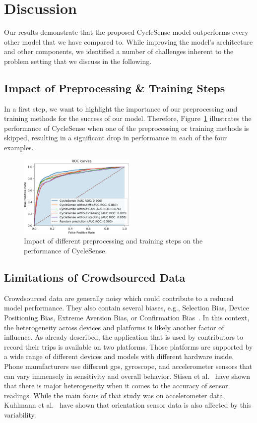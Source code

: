 \section{Discussion}
\label{sec:discussion_cyclesense}
Our results demonstrate that the proposed CycleSense model outperforms every other model that we have compared to.
While improving the model's architecture and other components, we identified a number of challenges inherent to the problem setting that we discuss in the following.


\subsection{Impact of Preprocessing \& Training Steps}
\label{subsec:impact_of_preprocessing_and_training_steps}
In a first step, we want to highlight the importance of our preprocessing and training methods for the success of our model.
Therefore, Figure~\ref{fig:impact} illustrates the performance of CycleSense when one of the preprocessing or training methods is skipped, resulting in a significant drop in performance in each of the four examples.

\begin{figure}%
	\centering
	\includegraphics[width=0.5\textwidth]{fig/impact.png}
	\caption{Impact of different preprocessing and training steps on the performance of CycleSense.}
	\label{fig:impact}
\end{figure}

\subsection{Limitations of Crowdsourced Data}
\label{subsec:limitations_of_crowdsourced_data}
Crowdsourced data are generally noisy which could contribute to a reduced model performance.
They also contain several biases, e.g., Selection Bias, Device Positioning Bias, Extreme Aversion Bias, or Confirmation Bias~\cite{basiri2019crowdsourced, chakraborty2017makes, kahneman1991anomalies}.
In this context, the heterogeneity across devices and platforms is likely another factor of influence.
As already described, the application that is used by contributors to record their trips is available on two platforms. 
Those platforms are supported by a wide range of different devices and models with different hardware inside. 
Phone manufacturers use different \ac{gps}, gyroscope, and accelerometer sensors that can vary immensely in sensitivity and overall behavior.
Stisen et al.~\cite{stisen2015smart} have shown that there is major heterogeneity when it comes to the accuracy of sensor readings. 
While the main focus of that study was on accelerometer data, Kuhlmann et al.~\cite{kuhlmann2021smartphone} have shown that orientation sensor data is also affected by this variability.

